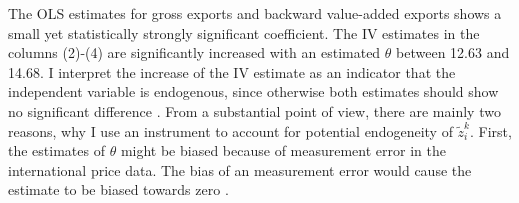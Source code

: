 \par
The OLS estimates for gross exports and backward value-added exports shows a small yet statistically strongly significant coefficient.
 The IV estimates in the columns (2)-(4) are significantly increased with an estimated $\theta$ between 12.63 and 14.68.
 I interpret the increase of the IV estimate as an indicator that the independent variable is endogenous, since otherwise both estimates should show no significant difference \textcite{hausman1978}.
From a substantial point of view, there are mainly two reasons, why I use an instrument to account for potential endogeneity of $\tilde{z}^k_i $.
First, the estimates of $\theta$ might be biased because of measurement error in the international price data.
The bias of an measurement error would cause the estimate to be biased towards zero \parencite{AngristKrueger01}.
